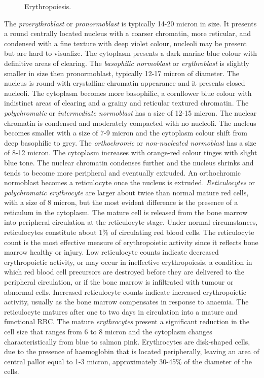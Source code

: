 \documentclass[final,a4paper,12pt,english]{UnicaPhdThesis3}
\begin{document}
\begin{figure}[!htbp]
\centering
\caption{\label{fig:Erythropoiesis} Erythropoiesis.}
\end{figure}

The \textit{proerythroblast} or \textit{pronormoblast} is typically 14-20 micron in size. It presents a round centrally located nucleus with a coarser chromatin, more reticular, and condensed with a fine texture with deep violet colour, nucleoli may be present but are hard to visualize. The cytoplasm presents a dark marine blue colour with definitive areas of clearing. The \textit{basophilic normoblast} or \textit{erythroblast} is slightly smaller in size then pronormoblast, typically 12-17 micron of diameter. The nucleus is round with crystalline chromatin appearance and it presents closed nucleoli. The cytoplasm becomes more basophilic, a cornflower blue colour with indistinct areas of clearing and a grainy and reticular textured chromatin. The \textit{polychromatic} or \textit{intermediate normoblast} has a size of 12-15 micron. The nuclear chromatin is condensed and moderately compacted with no nucleoli. The nucleus becomes smaller with a size of 7-9 micron and the cytoplasm colour shift from deep basophilic to grey. The \textit{orthochromic} or \textit{non-nucleated normoblast} has a size of 8-12 micron. The cytoplasm increases with orange-red colour tinges with slight blue tone. The nuclear chromatin condenses further and the nucleus shrinks and tends to become more peripheral and eventually extruded. An orthochromic normoblast becomes a reticulocyte once the nucleus is extruded. \textit{Reticulocytes} or \textit{polychromatic erythrocyte} are larger about twice than normal mature red cells, with a size of 8 micron, but the most evident difference is the presence of a reticulum in the cytoplasm. The mature cell is released from the bone marrow into peripheral circulation at the reticulocyte stage. Under normal circumstances, reticulocytes constitute about 1\% of circulating red blood cells. The reticulocyte count is the most effective measure of erythropoietic activity since it reflects bone marrow healthy or injury. Low reticulocyte counts indicate decreased erythropoietic activity, or may occur in ineffective erythropoiesis, a condition in which red blood cell precursors are destroyed before they are delivered to the peripheral circulation, or if the bone marrow is infiltrated with tumour or abnormal cells. Increased reticulocyte counts indicate increased erythropoietic activity, usually as the bone marrow compensates in response to anaemia. The reticulocyte matures after one to two days in circulation into a mature and functional RBC. The mature \textit{erythrocytes} present a significant reduction in the cell size that ranges from 6 to 8 micron and the cytoplasm changes characteristically from blue to salmon pink. Erythrocytes are disk-shaped cells, due to the presence of haemoglobin that is located peripherally, leaving an area of central pallor equal to 1-3 micron, approximately 30-45\% of the diameter of the cells. 
\end{document}
